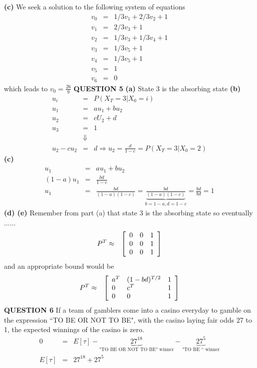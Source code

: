 \documentclass{amsart}
\theoremstyle{definition}
\theoremstyle{remark}
\numberwithin{equation}{section}
\begin{document}
\newline
{\bf (c)}
We seek a solution to the following system of equations
\begin{eqnarray}
\nonumber v_0&=&1/3 v_1 + 2/3 v_2 + 1 \\
\nonumber v_1&=&2/3 v_3 + 1\\
\nonumber v_2&=&1/3 v_3 + 1/3 v_4 + 1 \\
\nonumber v_3&=&1/3 v_5 + 1 \\
\nonumber v_4&=&1/3 v_5 + 1 \\
\nonumber v_5&=& 1 \\
\nonumber v_6&=&0
\end{eqnarray}
which leads to $v_0=\frac{26}{9}$
\newline
\bigskip
{\bf QUESTION 5}
\newline
{\bf (a)}
State 3 is the absorbing state 
\newline
{\bf (b)}
\begin{eqnarray}
\nonumber u_i&=&P(X_T=3|X_0=i) \\
\nonumber u_1&=&au_1+bu_2 \\
\nonumber u_2&=&cU_2+d \\
\nonumber u_3&=&1 \\
\nonumber & \Downarrow & \\
\nonumber u_2-cu_2&=&d \Rightarrow u_2=\frac{d}{1-c}=P(X_T=3|X_0=2)
\end{eqnarray}
{\bf (c)}
\begin{eqnarray}
\nonumber u_1&=&au_1+bu_2 \\
\nonumber (1-a)u_1&=&\frac{bd}{1-c} \\
\nonumber u_1&=& \frac{bd}{(1-a)(1-c)}=\underbrace{\frac{bd}{(1-a)(1-c)}}_{b=1-a,d=1-c}=\frac{bd}{bd}=1
\end{eqnarray}
{\bf (d) (e)}
Remember from part (a) that state 3 is the absorbing state so eventually ......
\begin{eqnarray}
\nonumber P^T&\approx&\left[
\begin{array}[4]{lll}
0 & 0 & 1  \\
0 & 0 & 1  \\
0 & 0 & 1  \\
\end{array}
\right]
\end{eqnarray}
and an appropriate bound would be
\begin{eqnarray}
\nonumber P^T&\approx&\left[
\begin{array}[4]{lll}
a^T & (1-bd)^{T/2} & 1  \\
0 & c^T & 1  \\
0 & 0 & 1  \\
\end{array}
\right]
\end{eqnarray}
\bigskip
{\bf QUESTION 6}
\newline
If a team of gamblers come into a casino everyday to gamble on the expression ``TO BE OR NOT TO BE", with the casino laying fair odds 27 to 1, the expected winnings of the casino is zero. 
\begin{eqnarray}
\nonumber 0&=&E[\tau]-\underbrace{27^{18}}_{\text{"TO BE OR NOT TO BE" winner}}-\underbrace{27^5}_{\text{"TO BE `` winner}} \\
\nonumber E[\tau]&=&27^{18}+27^5
\end{eqnarray}
\end{document}

